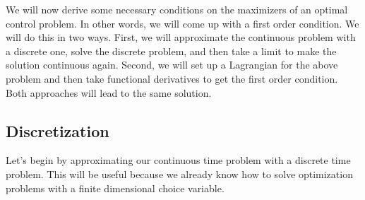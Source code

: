 We will now derive some necessary conditions on the maximizers of an
optimal control problem. In other words, we will come up with a first
order condition. We will do this in two ways. First, we will
approximate the continuous problem with a discrete one, solve the
discrete problem, and then take a limit to make the solution
continuous again. Second, we will set up a Lagrangian for the above
problem and then take functional derivatives to get the first order
condition. Both approaches will lead to the same solution.

\subsection{Discretization}

Let's begin by approximating our continuous time problem with a
discrete time problem. This will be useful because we already know how
to solve optimization problems with a finite dimensional choice
variable.

